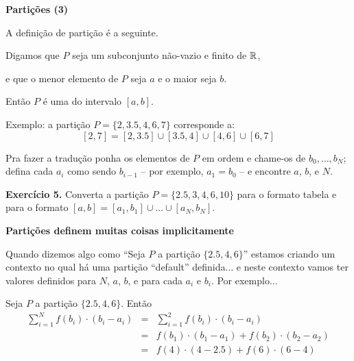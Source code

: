 \documentclass[oneside,12pt]{article}
\begin{document}
\newpage


{\bf Partições (3)}

A definição  de partição é a seguinte.

Digamos que $P$ seja um subconjunto não-vazio e finito de $\mathbb{R}$,

e que o menor elemento de $P$ seja $a$ e o maior seja $b$.

Então $P$ é uma  do intervalo $[a,b]$.

\msk

Exemplo: a partição $P=\{2,3.5,4,6,7\}$ corresponde a:
%
$$[2,7] = [2,3.5]∪[3.5,4]∪[4,6]∪[6,7]$$

Pra fazer a tradução ponha os elementos de $P$ em ordem e chame-os de
$b_0,\ldots,b_N$; defina cada $a_i$ como sendo $b_{i-1}$ -- por
exemplo, $a_1 = b_0$ -- e encontre $a$, $b$, e $N$.

\msk

{\bf Exercício 5.} Converta a partição $P=\{2.5,3,4,6,10\}$ para o
formato tabela e para o formato $[a,b] = [a_1,b_1]∪\ldots∪[a_N,b_N].$



\newpage


{\bf Partições definem muitas coisas implicitamente}

Quando dizemos algo como ``Seja $P$ a partição $\{2.5,4,6\}$'' estamos
criando um contexto no qual há uma partição ``default'' definida... e
neste contexto vamos ter valores definidos para $N$, $a$, $b$, e para
cada $a_i$ e $b_i$. Por exemplo...

\msk

Seja $P$ a partição $\{2.5,4,6\}$. Então
%
$$\begin{array}{rcl}
  \sum_{i=1}^N f(b_i)·(b_i-a_i)
     &=& \sum_{i=1}^2 f(b_i)·(b_i-a_i) \\
     &=& f(b_1)·(b_1-a_1) + f(b_2)·(b_2-a_2) \\
     &=& f(4)·(4-2.5) + f(6)·(6-4) \\
  \end{array}
$$
\end{document}
